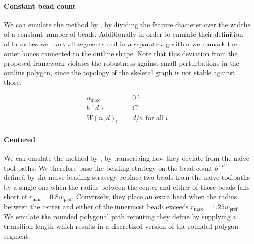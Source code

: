 \paragraph{Constant bead count}
We can emulate the method by \citeauthor{Ding2016a}, by dividing the feature diameter over the widths of a constant number of beads.
Additionally in order to emulate their definition of branches we mark all segments and in a separate algorithm we unmark the outer bones connected to the outline shape.
Note that this deviation from the proposed framework violates the robustness against small perturbations in the outline polygon, since the topology of the skeletal graph is not stable against those.

\begin{align*}
\alpha_\text{max} &= \SI{0}{\degree} \\
b(d) &= C \\
W(n,d)_i &= d / n \text{ for all } i 
\end{align*}



\paragraph{Centered}
We can emulate the method by \citeauthor{Jin2017JMS}, by transcribing how they deviate from the naive tool paths.
We therefore base the beading strategy on the bead count $b^(d)$ defined by the naive beading strategy.
\citeauthor{Jin2017JMS} replace two beads from the naive toolpaths by a single one when the radius between the center and either of those beads falls short of $r_\text{min} = 0.8 w_\text{pref}$.
Conversely, they place an extra bead when the radius between the center and either of the innermost beads exceeds $r_\text{max} = 1.25 w_\text{pref}$.\cite{Jin2017JMS}
We emulate the rounded polygonal path rerouting they define by supplying a transition length which results in a discretized version of the rounded polygon segment.

